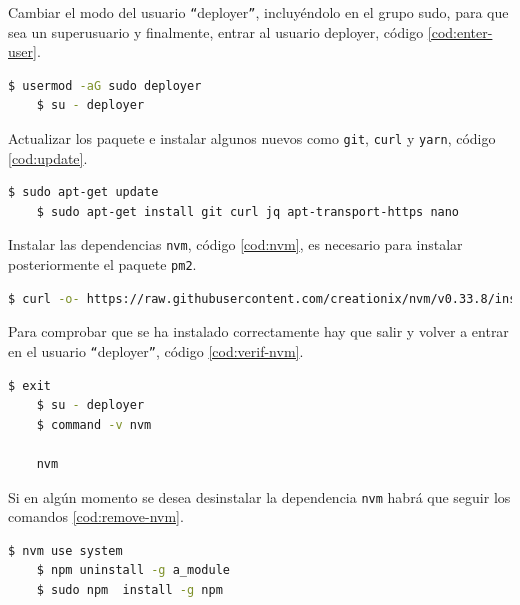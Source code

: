 Cambiar el modo del usuario \texttt{``{}}deployer\texttt{''}, incluyéndolo en el grupo sudo, para que sea un superusuario y finalmente, entrar al usuario deployer, código \ref{cod:enter-user}.\\

\begin{lstlisting}[language=Bash,caption=Instalación \textit{blockchain}. Parte III, label=cod:enter-user, style=Consola]
	$ usermod -aG sudo deployer
	$ su - deployer
\end{lstlisting}

Actualizar los paquete e instalar algunos nuevos como \texttt{git}, \texttt{curl} y \texttt{yarn}, código \ref{cod:update}.\\

\begin{lstlisting}[language=Bash,caption=Instalación \textit{blockchain}. Parte IV, label=cod:update, style=Consola]
	$ sudo apt-get update
	$ sudo apt-get install git curl jq apt-transport-https nano
\end{lstlisting}

Instalar las dependencias \texttt{nvm}, código \ref{cod:nvm}, es necesario para instalar posteriormente el paquete \texttt{pm2}.\\

\begin{lstlisting}[language=Bash,caption=Instalación \textit{blockchain}. Parte V, label=cod:nvm, style=Consola]
	$ curl -o- https://raw.githubusercontent.com/creationix/nvm/v0.33.8/install.sh | bash
\end{lstlisting}

Para comprobar que se ha instalado correctamente hay que salir y volver a entrar en el usuario \texttt{``{}}deployer\texttt{''}, código \ref{cod:verif-nvm}.\\

\begin{lstlisting}[language=Bash,caption=Instalación \textit{blockchain}. Parte VI, label=cod:verif-nvm, style=Consola]
	$ exit
	$ su - deployer
	$ command -v nvm

	nvm
\end{lstlisting}

Si en algún momento se desea desinstalar la dependencia \texttt{nvm} habrá que seguir los comandos \ref{cod:remove-nvm}.\\

\begin{lstlisting}[language=Bash,caption=Instalación \textit{blockchain}. Parte VII, label=cod:remove-nvm, style=Consola]
	$ nvm use system
	$ npm uninstall -g a_module
	$ sudo npm  install -g npm
\end{lstlisting}

